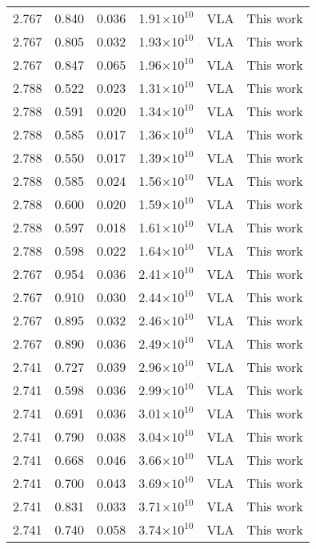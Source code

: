 \documentclass{aa}
\begin{document}
{\begin{longtable}{c|c|c|c|c|c}
  2.767 &   0.840   &  0.036 &  1.91$\times 10^{10}$ &  VLA & This work \\
  2.767 &   0.805   &  0.032 &  1.93$\times 10^{10}$ &  VLA & This work \\
  2.767 &   0.847   &  0.065 &  1.96$\times 10^{10}$ &  VLA & This work \\
  2.788 &   0.522   &  0.023 &  1.31$\times 10^{10}$ &  VLA & This work \\
  2.788 &   0.591   &  0.020 &  1.34$\times 10^{10}$ &  VLA & This work \\
  2.788 &   0.585   &  0.017 &  1.36$\times 10^{10}$ &  VLA & This work \\
  2.788 &   0.550   &  0.017 &  1.39$\times 10^{10}$ &  VLA & This work \\
  2.788 &   0.585   &  0.024 &  1.56$\times 10^{10}$ &  VLA & This work \\
  2.788 &   0.600   &  0.020 &  1.59$\times 10^{10}$ &  VLA & This work \\
  2.788 &   0.597   &  0.018 &  1.61$\times 10^{10}$ &  VLA & This work \\
  2.788 &   0.598   &  0.022 &  1.64$\times 10^{10}$ &  VLA & This work \\
  2.767 &   0.954   &  0.036 &  2.41$\times 10^{10}$ &  VLA & This work \\
  2.767 &   0.910   &  0.030 &  2.44$\times 10^{10}$ &  VLA & This work \\
  2.767 &   0.895   &  0.032 &  2.46$\times 10^{10}$ &  VLA & This work \\
  2.767 &   0.890   &  0.036 &  2.49$\times 10^{10}$ &  VLA & This work \\
  2.741 &   0.727   &  0.039 &  2.96$\times 10^{10}$ &  VLA & This work \\
  2.741 &   0.598   &  0.036 &  2.99$\times 10^{10}$ &  VLA & This work \\
  2.741 &   0.691   &  0.036 &  3.01$\times 10^{10}$ &  VLA & This work \\
  2.741 &   0.790   &  0.038 &  3.04$\times 10^{10}$ &  VLA & This work \\
  2.741 &   0.668   &  0.046 &  3.66$\times 10^{10}$ &  VLA & This work \\
  2.741 &   0.700   &  0.043 &  3.69$\times 10^{10}$ &  VLA & This work \\
  2.741 &   0.831   &  0.033 &  3.71$\times 10^{10}$ &  VLA & This work \\
  2.741 &   0.740   &  0.058 &  3.74$\times 10^{10}$ &  VLA & This work \\

\end{longtable}}
\end{document}
